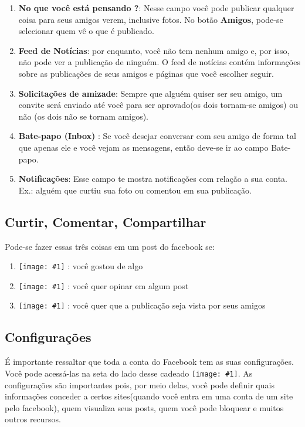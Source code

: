 \documentclass[hidelinks,12pt]{article}
\newcommand{\icon}[1]{\texttt{[image: \#1]}}
\begin{document}
\begin{enumerate}
	\item \textbf{No que você está pensando ?}: Nesse campo você pode publicar qualquer coisa para seus amigos verem, inclusive fotos. No botão \textbf{Amigos}, pode-se selecionar quem vê o que é publicado.
	\item \textbf{Feed de Notícias}: por enquanto, você não tem nenhum amigo e, por isso, não pode ver a publicação de ninguém. O feed de notícias contém informações sobre as publicações de seus amigos e páginas que você escolher seguir.
	\item \textbf{Solicitações de amizade}: Sempre que alguém quiser ser seu amigo, um convite será enviado até você para ser aprovado(os dois tornam-se amigos) ou não (os dois não se tornam amigos).
	\item \textbf{Bate-papo (Inbox) }: Se você desejar conversar com seu amigo de forma tal que apenas ele e você vejam as mensagens, então deve-se ir ao campo Bate-papo.
	\item \textbf{Notificações}: Esse campo te mostra notificações com relação a sua conta. Ex.: alguém que curtiu sua foto ou comentou em sua publicação.
\end{enumerate}

\subsection{Curtir, Comentar, Compartilhar}

Pode-se fazer essas três coisas em um post do facebook se:

\begin{enumerate}
	\item  \icon{Figures/curtir} : você gostou de algo
	\item  \icon{Figures/comentar} : você quer opinar em algum post
	\item  \icon{Figures/compartilhar} : você quer que a publicação seja vista por seus amigos
\end{enumerate}

\subsection{Configurações}

É importante ressaltar que toda a conta do Facebook tem as suas configurações. Você pode acessá-las na seta do lado desse cadeado \icon{Figures/fb5}.
As configurações são importantes pois, por meio delas,  você pode definir quais informações conceder a certos sites(quando você entra em uma conta de um site pelo facebook), quem visualiza seus posts, quem você pode bloquear e muitos outros recursos.
\end{document}
